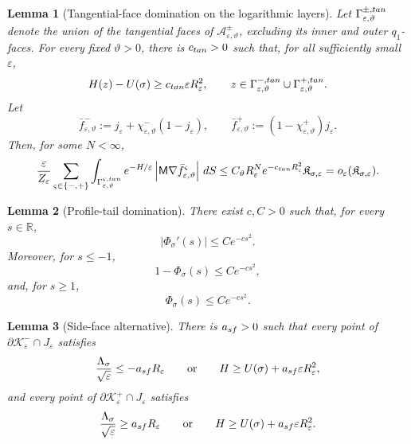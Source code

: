 \documentclass[10pt,a4paper]{amsart}
\newtheorem{lemma}{Lemma}
\newcommand{\R}{\mathbb R}
\newcommand{\eps}{\varepsilon}
\begin{document}
\begin{lemma}[Tangential-face domination on the logarithmic layers]
\label{lem:stable-side-gaussian-domination}
Let $\Gamma_{\eps,\vartheta}^{\pm,\rm tan}$ denote the union of the tangential
faces of $\mathcal A_{\eps,\vartheta}^\pm$, excluding its inner and outer
$q_1$-faces.  For every fixed $\vartheta>0$, there is $c_{\rm tan}>0$ such that,
for all sufficiently small $\eps$,
\[
H(z)-U(\sigma)\ge c_{\rm tan}\eps R_\eps^2,
\qquad z\in
\Gamma_{\eps,\vartheta}^{-,\rm tan}\cup
\Gamma_{\eps,\vartheta}^{+,\rm tan}.
\]
Let
\[
\bar f_{\eps,\vartheta}^-
:=j_\eps+\chi_{\eps,\vartheta}^-(1-j_\eps),
\qquad
\bar f_{\eps,\vartheta}^+
:=(1-\chi_{\eps,\vartheta}^+)j_\eps.
\]
Then, for some $N<\infty$,
\[
\frac{\eps}{Z_\eps}
\sum_{\varsigma\in\{-,+\}}
\int_{\Gamma_{\eps,\vartheta}^{\varsigma,\rm tan}}
e^{-H/\eps}
\left|\mathsf M\nabla\bar f_{\eps,\vartheta}^\varsigma\right|\,dS
\le C_\vartheta R_\eps^N e^{-c_{\rm tan}R_\eps^2}
\mathfrak K_{\sigma,\eps}
=o_\eps(\mathfrak K_{\sigma,\eps}).
\]
\end{lemma}

\begin{lemma}[Profile-tail domination]
\label{lem:profile-tail-domination}
There exist $c,C>0$ such that, for every $s\in\R$,
\[
|\Phi_\sigma'(s)|\le Ce^{-cs^2}.
\]
Moreover, for $s\le-1$,
\[
1-\Phi_\sigma(s)\le Ce^{-cs^2},
\]
and, for $s\ge1$,
\[
\Phi_\sigma(s)\le Ce^{-cs^2}.
\]
\end{lemma}

\begin{lemma}[Side-face alternative]
\label{lem:side-face-alternative}
There is $a_{\rm sf}>0$ such that every point of
$\partial\mathcal K_\eps^-\cap J_\eps$ satisfies
\[
\frac{\Lambda_\sigma}{\sqrt\eps}\le-a_{\rm sf}R_\eps\qquad\text{or}\qquad
H\ge U(\sigma)+a_{\rm sf}\eps R_\eps^2,
\]
and every point of $\partial\mathcal K_\eps^+\cap J_\eps$ satisfies
\[
\frac{\Lambda_\sigma}{\sqrt\eps}\ge a_{\rm sf}R_\eps
\qquad\text{or}\qquad
H\ge U(\sigma)+a_{\rm sf}\eps R_\eps^2.
\]
\end{lemma}
\end{document}
